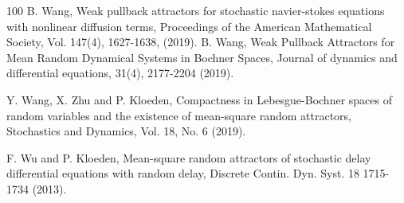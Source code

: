 \documentclass[10pt]{article}
\numberwithin{figure}{section}
\numberwithin{equation}{section}
\newcommand{\0}{{\theta}}
\begin{document}
\begin{thebibliography}{100}
 B. Wang, Weak pullback attractors for stochastic navier-stokes equations with nonlinear diffusion terms, Proceedings of the American Mathematical Society, Vol. 147(4), 1627-1638, (2019).
     B. Wang, Weak Pullback Attractors for Mean Random Dynamical Systems in Bochner Spaces, Journal of dynamics and differential equations, 31(4), 2177-2204 (2019).

  Y. Wang, X. Zhu and P. Kloeden, Compactness in Lebesgue-Bochner spaces of random variables and the existence of mean-square random attractors, Stochastics and Dynamics, Vol. 18, No. 6 (2019).

 F. Wu and P. Kloeden, Mean-square random attractors of stochastic delay
differential equations with random delay, Discrete Contin. Dyn. Syst. 18 1715-1734 (2013).














\end{thebibliography}
\end{document}
